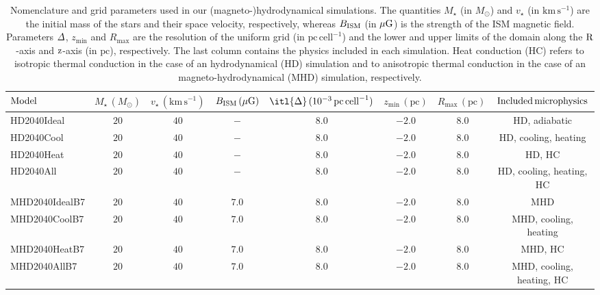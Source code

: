 \documentclass[useAMS,usenatbib]{mn2e}
\begin{document}
 
\begin{table}
	\centering
	\caption{
	 Nomenclature and grid parameters used in our (magneto-)hydrodynamical
simulations. The quantities $M_{\star}$ (in $M_{\odot}$) and
$v_{\star}$ (in $\mathrm{km}\, \mathrm{{s}^{-1}}$) are the initial mass of the
stars and their space velocity, respectively, whereas $B_{\rm ISM}$ (in $\mu \rm G$) is 
the strength of the ISM magnetic field. Parameters $\it \Delta$,
$z_{\mathrm{min}}$ and $R_{\mathrm{max}}$ are the resolution of the uniform grid
(in $\mathrm{pc}\, \mathrm{{cell}^{-1}}$) and the lower and upper limits of the 
domain along the $\rm R$-axis and $\rm z$-axis (in $\mathrm{pc}$), respectively.  The
last column contains the physics included in each simulation. Heat conduction (HC) 
refers to isotropic thermal conduction in the case of an hydrodynamical (HD) simulation and 
to anisotropic thermal conduction in the case of an magneto-hydrodynamical (MHD) simulation, 
respectively. 
	 }
	\begin{tabular}{lccccccc}
	\hline
	${\rm {Model}}$ &   $M_{\star}\, (M_{\odot})$                              
 			&   $v_{\star}\, (\mathrm{km}\, \mathrm{s}^{-1})$
			&   $B_{\rm ISM}\, (\mu \rm G)$ 
			&   $\itl{\Delta}\, ( 10^{-3}\, \mathrm{pc}\, \mathrm{cell}^{-1})$ 
			&   $z_{\mathrm{min}}\, (\mathrm{pc})$ 
			&   $R_{\mathrm{max}}\, (\mathrm{pc})$
			&   $\rm Included\, microphysics$
			\\ \hline   
	HD2040Ideal      &  $20$  &  $40$ & $-$   &  $8.0$   &  $-2.0$     &  $~8.0$      & HD, adiabatic  \\             
	HD2040Cool       &  $20$  &  $40$ & $-$   &  $8.0$   &  $-2.0$     &  $~8.0$      & HD, cooling, heating  \\        
	HD2040Heat       &  $20$  &  $40$ & $-$   &  $8.0$   &  $-2.0$     &  $~8.0$      & HD, HC  \\ 
	HD2040All        &  $20$  &  $40$ & $-$   &  $8.0$   &  $-2.0$     &  $~8.0$      & HD, cooling, heating, HC  \\             
	MHD2040IdealB7   &  $20$  &  $40$ & $7.0$   &  $8.0$   &  $-2.0$     &  $~8.0$   & MHD   \\        
	MHD2040CoolB7    &  $20$  &  $40$ & $7.0$   &  $8.0$   &  $-2.0$     &  $~8.0$   & MHD, cooling, heating  \\  
	MHD2040HeatB7    &  $20$  &  $40$ & $7.0$   &  $8.0$   &  $-2.0$     &  $~8.0$   & MHD, HC  \\         
	MHD2040AllB7     &  $20$  &  $40$ & $7.0$   &  $8.0$   &  $-2.0$     &  $~8.0$   & MHD, cooling, heating, HC  \\     

\end{tabular}
\end{table}
\end{document}
